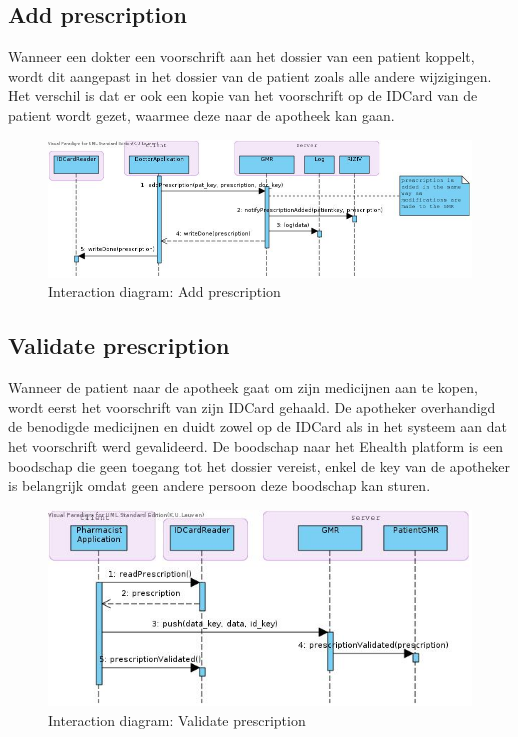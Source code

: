 \documentclass[a4paper,10pt]{article}
\begin{document}
\subsection{Add prescription}
\label{interaction:addPrescription}
Wanneer een dokter een voorschrift aan het dossier van een patient koppelt, wordt dit aangepast in het dossier van de patient zoals alle andere wijzigingen.
Het verschil is dat er ook een kopie van het voorschrift op de IDCard van de patient wordt gezet, waarmee deze naar de apotheek kan gaan. 

\begin{figure}[!h]
  \includegraphics[width=\textwidth]{../images/addprescription.jpg}
  \caption{Interaction diagram: Add prescription}
\end{figure}

\subsection{Validate prescription}
\label{interaction:validatePrescription}
Wanneer de patient naar de apotheek gaat om zijn medicijnen aan te kopen, wordt eerst het voorschrift van zijn IDCard gehaald. De apotheker overhandigd de benodigde medicijnen en duidt zowel op de IDCard als in het systeem aan dat het voorschrift werd gevalideerd. De boodschap naar het Ehealth platform is een boodschap die geen toegang tot het dossier vereist, enkel de key van de apotheker is belangrijk omdat geen andere persoon deze boodschap kan sturen.

\begin{figure}[!h]
  \includegraphics[width=\textwidth]{../images/validatePrescription.jpg}
  \caption{Interaction diagram: Validate prescription}
\end{figure}
\end{document}
